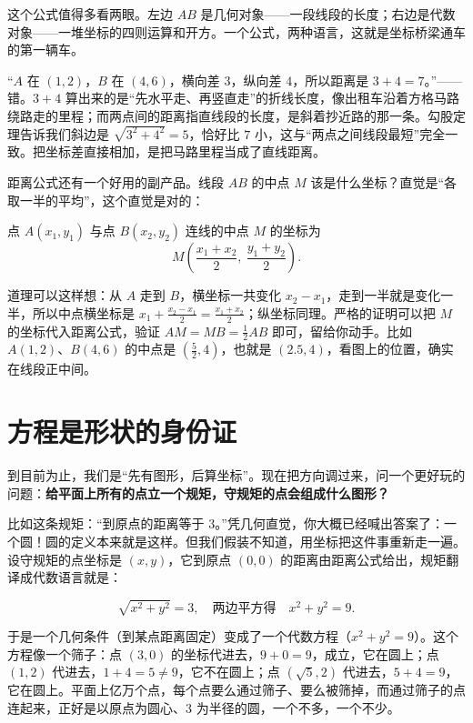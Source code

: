 这个公式值得多看两眼。左边 $AB$ 是几何对象——一段线段的长度；右边是代数对象——一堆坐标的四则运算和开方。一个公式，两种语言，这就是坐标桥梁通车的第一辆车。

\begin{fanli}
“$A$ 在 $(1,2)$，$B$ 在 $(4,6)$，横向差 $3$，纵向差 $4$，所以距离是 $3+4=7$。”——错。$3+4$ 算出来的是“先水平走、再竖直走”的折线长度，像出租车沿着方格马路绕路走的里程；而两点间的距离指直线段的长度，是斜着抄近路的那一条。勾股定理告诉我们斜边是 $\sqrt{3^{2}+4^{2}}=5$，恰好比 $7$ 小，这与“两点之间线段最短”完全一致。把坐标差直接相加，是把马路里程当成了直线距离。
\end{fanli}

距离公式还有一个好用的副产品。线段 $AB$ 的中点 $M$ 该是什么坐标？直觉是“各取一半的平均”，这个直觉是对的：

\begin{tuilun}[中点公式]
点 $A(x_{1},y_{1})$ 与点 $B(x_{2},y_{2})$ 连线的中点 $M$ 的坐标为
\[
M\left(\frac{x_{1}+x_{2}}{2},\ \frac{y_{1}+y_{2}}{2}\right).
\]
\end{tuilun}

道理可以这样想：从 $A$ 走到 $B$，横坐标一共变化 $x_{2}-x_{1}$，走到一半就是变化一半，所以中点横坐标是 $x_{1}+\frac{x_{2}-x_{1}}{2}=\frac{x_{1}+x_{2}}{2}$；纵坐标同理。严格的证明可以把 $M$ 的坐标代入距离公式，验证 $AM=MB=\frac{1}{2}AB$ 即可，留给你动手。比如 $A(1,2)$、$B(4,6)$ 的中点是 $(\frac{5}{2},4)$，也就是 $(2.5,4)$，看图上的位置，确实在线段正中间。

\section{方程是形状的身份证}

到目前为止，我们是“先有图形，后算坐标”。现在把方向调过来，问一个更好玩的问题：\textbf{给平面上所有的点立一个规矩，守规矩的点会组成什么图形？}

比如这条规矩：“到原点的距离等于 $3$。”凭几何直觉，你大概已经喊出答案了：一个圆！圆的定义本来就是这样。但我们假装不知道，用坐标把这件事重新走一遍。设守规矩的点坐标是 $(x,y)$，它到原点 $(0,0)$ 的距离由距离公式给出，规矩翻译成代数语言就是：

\[
\sqrt{x^{2}+y^{2}}=3,\quad\text{两边平方得}\quad x^{2}+y^{2}=9.
\]

于是一个几何条件（到某点距离固定）变成了一个代数方程（$x^{2}+y^{2}=9$）。这个方程像一个筛子：点 $(3,0)$ 的坐标代进去，$9+0=9$，成立，它在圆上；点 $(1,2)$ 代进去，$1+4=5\ne 9$，它不在圆上；点 $(\sqrt{5},2)$ 代进去，$5+4=9$，它在圆上。平面上亿万个点，每个点要么通过筛子、要么被筛掉，而通过筛子的点连起来，正好是以原点为圆心、$3$ 为半径的圆，一个不多，一个不少。

